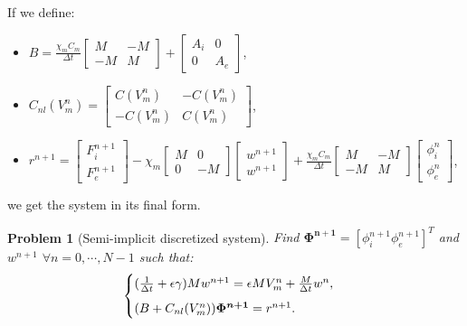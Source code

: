 \documentclass[a4paper,11pt]{article}
\newtheorem{problem}{Problem}
\begin{document}
\vspace{5mm}
\noindent If we define:
\begin{itemize}
\item $B=\frac{\chi_m C_m}{\Delta t} \begin{bmatrix} M &-M \\-M & M \end{bmatrix}+\begin{bmatrix} A_i & 0 \\ 0 & A_e \end{bmatrix}$,
\item $C_{nl}(V_m^n)=\begin{bmatrix}C(V_m^n) & -C(V_m^n) \\ -C(V_m^n) & C(V_m^n) \end{bmatrix}$,
\item $r^{n+1}=\begin{bmatrix} F_i^{n+1} \\ F_e^{n+1}\end{bmatrix}-\chi_m \begin{bmatrix}M & 0 \\ 0 & -M \end{bmatrix} \begin{bmatrix}w^{n+1} \\ w^{n+1} \end{bmatrix}+\frac{\chi_m C_m}{\Delta t} \begin{bmatrix} M &-M \\-M & M \end{bmatrix} \begin{bmatrix} \phi_i^n \\ \phi_e^n \end{bmatrix}$,
\end{itemize} \vspace{5mm}
we get the system in its final form.  \\
\begin{problem}[Semi-implicit discretized system]
Find $\bm{\Phi^{n+1}}=[\phi_i^{n+1} \phi_e^{n+1}]^T$ and $w^{n+1}$ $\forall n=0,\cdots,N-1$ such that:
\begin{equation*}
\begin{cases}
(\frac{1}{\Delta t}+\epsilon \gamma)M w^{n+1}=\epsilon M V_m^n+\frac{M}{\Delta t} w^n, \vspace{2mm} \\
(B+C_{nl}(V_m^n)) \bm{\Phi^{n+1}}=r^{n+1}.
\end{cases}
\end{equation*} 
\end{problem}
\end{document}
